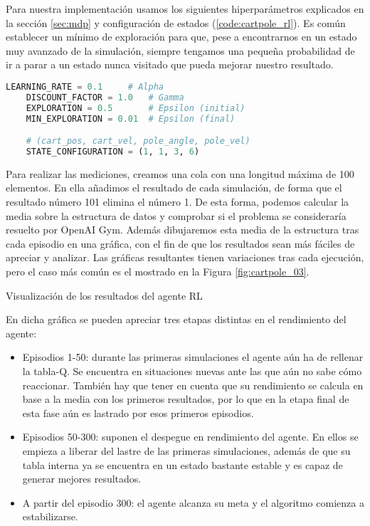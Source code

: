 Para nuestra implementación usamos los siguientes hiperparámetros explicados en la sección \ref{sec:mdp} y configuración de estados (\ref{code:cartpole_rl}). Es común establecer un mínimo de exploración para que, pese a encontrarnos en un estado muy avanzado de la simulación, siempre tengamos una pequeña probabilidad de ir a parar a un estado nunca visitado que pueda mejorar nuestro resultado.

\begin{minipage}{0.9\linewidth}%
    \begin{lstlisting}[frame=tb, language=Python, caption=Hiperparámetros y configuración de estados, label=code:cartpole_rl]
    LEARNING_RATE = 0.1     # Alpha
    DISCOUNT_FACTOR = 1.0   # Gamma
    EXPLORATION = 0.5       # Epsilon (initial)
    MIN_EXPLORATION = 0.01  # Epsilon (final)

    # (cart_pos, cart_vel, pole_angle, pole_vel)
    STATE_CONFIGURATION = (1, 1, 3, 6)
    \end{lstlisting}%
\end{minipage}

Para realizar las mediciones, creamos una cola con una longitud máxima de 100 elementos. En ella añadimos el resultado de cada simulación, de forma que el resultado número 101 elimina el número 1. De esta forma, podemos calcular la media sobre la estructura de datos y comprobar si el problema se consideraría resuelto por OpenAI Gym. Además dibujaremos esta media de la estructura tras cada episodio en una gráfica, con el fin de que los resultados sean más fáciles de apreciar y analizar. Las gráficas resultantes tienen variaciones tras cada ejecución, pero el caso más común es el mostrado en la Figura \ref{fig:cartpole_03}.

%
       {Visualización de los resultados del agente RL}

En dicha gráfica se pueden apreciar tres etapas distintas en el rendimiento del agente:
\begin{itemize}
    \item Episodios 1-50: durante las primeras simulaciones el agente aún ha de rellenar la tabla-Q. Se encuentra en situaciones nuevas ante las que aún no sabe cómo reaccionar. También hay que tener en cuenta que su rendimiento se calcula en base a la media con los primeros resultados, por lo que en la etapa final de esta fase aún es lastrado por esos primeros episodios.
    \item Episodios 50-300: suponen el despegue en rendimiento del agente. En ellos se empieza a liberar del lastre de las primeras simulaciones, además de que su tabla interna ya se encuentra en un estado bastante estable y es capaz de generar mejores resultados.
    \item A partir del episodio 300: el agente alcanza su meta y el algoritmo comienza a estabilizarse.
\end{itemize}

